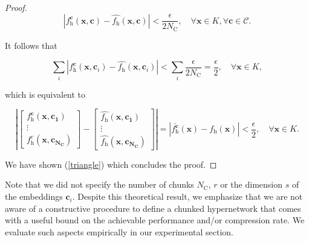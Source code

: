 \documentclass{article}
\begin{document}
\begin{proof}
  \begin{equation}
  |f^{\mathbf{c}}_\mathrm{h}(\mathbf{x}, \mathbf{c}) - \hat{f_\mathrm{h}}(\mathbf{x}, \mathbf{c})| < \frac{\epsilon}{2N_\text{C}}, \quad \forall \mathbf{x} \in K, \forall  \mathbf{c} \in \mathcal{C}.
  \end{equation}
  
  It follows that
  
  \begin{equation}
  \sum_{i} |f^{\mathbf{c}}_\mathrm{h}(\mathbf{x}, \mathbf{c}_i) - \hat{f_\mathrm{h}}(\mathbf{x}, \mathbf{c}_i)| < \sum_{i} \frac{\epsilon}{2N_\text{C}} = \frac{\epsilon}{2}, \quad \forall \mathbf{x} \in K,
  \end{equation}
  
  which is equivalent to
  
  \begin{equation}
   | \begin{bmatrix}  f^{\mathbf{c}}_\mathrm{h}(\mathbf{x}, \mathbf{c_1}) \\ \vdots \\  f^{c}_\mathrm{h}(\mathbf{x}, \mathbf{c_{N_\text{C}}})  \end{bmatrix} - \begin{bmatrix} \hat{f_\mathrm{h}}(\mathbf{x}, \mathbf{\mathbf{c}_1}) \\ 
  \vdots \\
   \hat{f_\mathrm{h}}(\mathbf{x}, \mathbf{\mathbf{c}_{N_\text{C}}}) 
   \end{bmatrix}  | = |\bar{f^{\mathbf{c}}_\mathrm{h}}(\mathbf{x})  - f_\mathrm{h}(\mathbf{x}) |  < \frac{\epsilon}{2}, \quad \forall \mathbf{x} \in K.
  \end{equation}
  
  We have shown (\ref{triangle}) which concludes the proof.
  \end{proof}
Note that we did not specify the number of chunks $N_\text{C}$, $r$ or the dimension $s$ of the embeddings $\mathbf{c}_i$. Despite this theoretical result, we emphasize that we are not aware of a constructive procedure to define a chunked hypernetwork that comes with a useful bound on the achievable performance and/or compression rate. We evaluate such aspects empirically in our experimental section.

\newpage
\end{document}
